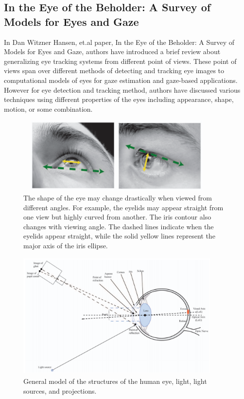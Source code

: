 \subsection{In the Eye of the Beholder: A Survey of Models for Eyes and Gaze}

In Dan Witzner Hansen, et.al \cite{16} paper, In the Eye of the Beholder: A Survey of Models for Eyes and Gaze, authors have introduced a brief review about generalizing eye tracking systems from different point of views. These point of views span over different methods of detecting and tracking eye images to computational models of eyes for gaze estimation and gaze-based applications. However for eye detection and tracking method, authors have discussed various techniques using different properties of the eyes including appearance, shape, motion, or some combination.

\begin{figure}[!hbt]
  \centering
  \includegraphics[width=4in,height=1.5in]{danWitzer.png}
  \caption{The shape of the eye may change drastically when viewed from different angles. For example, the eyelids may appear straight from one view but highly curved from another. The iris contour also changes with viewing angle. The dashed lines indicate when the eyelids appear straight, while the solid yellow lines represent the major axis of the iris ellipse.}
  \label{danwitzner}
\end{figure}

\begin{figure}[!hbt]
  \centering
  \includegraphics[width=4in,height=2.5in]{danWitzer2.png}
  \caption{General model of the structures of the human eye, light, light sources, and projections.}
  \label{danwitzner2}
\end{figure}


